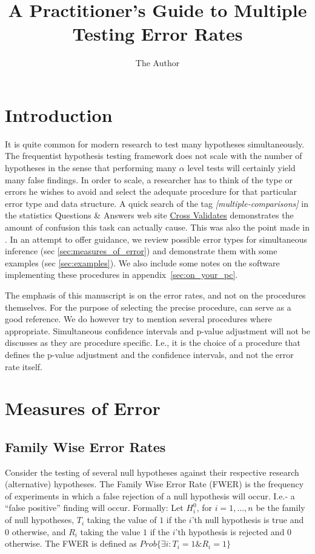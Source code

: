 \documentclass[draft,12pt]{article}
\title{A Practitioner's Guide to Multiple Testing Error Rates}
\author{The Author}
\date{}
\begin{document}
\maketitle


\section{Introduction}

It is quite common for modern research to test many hypotheses simultaneously. The frequentist hypothesis testing framework does not scale with the number of hypotheses in the sense that performing many $\alpha$ level tests will certainly yield many false findings. In order to scale, a researcher has to think of the type or errors he wishes to avoid and select the adequate procedure for that particular error type and data structure. A quick search of the tag \emph{[multiple-comparisons]} in the statistics Questions \& Answers web site \href{http://stats.stackexchange.com}{Cross Validates} demonstrates the amount of confusion this task can actually cause. This was also the point made in \citet[][section 4.4]{benjamini_simultaneous_2010}. 
In an attempt to offer guidance, we review possible error types for simultaneous inference (sec \ref{sec:measures_of_error}) and demonstrate them with some examples (sec \ref{sec:examples}). We also include some notes on the software implementing these procedures in appendix~\ref{sec:on_your_pc}.

The emphasis of this manuscript is on the error rates, and not on the procedures themselves. For the purpose of selecting the precise procedure, \citet{farcomeni_review_2008} can serve as a good reference. We do however try to mention several procedures where appropriate.  Simultaneous confidence intervals and p-value adjustment will not be discusses as they are procedure specific. I.e., it is the choice of a procedure that defines the p-value adjustment and the confidence intervals, and not the error rate itself.


\section{\label{sec:measures_of_error}Measures of Error}

\subsection{Family Wise Error Rates}
Consider the testing of several null hypotheses against their respective research (alternative) hypotheses. The Family Wise Error Rate (FWER) is the frequency of experiments in which a false rejection of a null hypothesis will occur. I.e.- a ``false positive'' finding will occur.
Formally: Let $H^0_i$, for $i=1,\ldots,n$ be the family of null hypotheses, $T_i$ taking the value of $1$ if the $i$'th null hypothesis is true and 0 otherwise,  and $R_i$ taking the value $1$ if the $i$'th hypothesis is rejected and 0 otherwise.
The FWER is defined as $Prob\{\exists i:T_i=1 \& R_i=1  \}$
\end{document}
